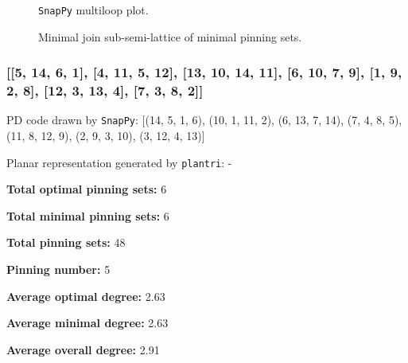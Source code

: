 \documentclass{article}%
\begin{document}
\begin{multicols}{2}
\begin{figure}[H]
\centering

\caption{\texttt{SnapPy} multiloop plot.}
\label{fig:tex/img/[[7, 14, 8, 1], [6, 11, 7, 12], [13, 10, 14, 11], [8, 3, 9, 4], [1, 4, 2, 5], [12, 5, 13, 6], [2, 9, 3, 10]].svg}
\end{figure}
\columnbreak

\begin{figure}[H]
\centering
\scalebox{0.8}{}
\caption{Minimal join sub-semi-lattice of minimal pinning sets.}
\label{fig:tex/img/[[7, 14, 8, 1], [6, 11, 7, 12], [13, 10, 14, 11], [8, 3, 9, 4], [1, 4, 2, 5], [12, 5, 13, 6], [2, 9, 3, 10]].pgf}
\end{figure}
\end{multicols}

\newpage

\subsubsection{[[5, 14, 6, 1], [4, 11, 5, 12], [13, 10, 14, 11], [6, 10, 7, 9], [1, 9, 2, 8], [12, 3, 13, 4], [7, 3, 8, 2]]}

{\small\noindent PD code drawn by \texttt{SnapPy}: [(14, 5, 1, 6), (10, 1, 11, 2), (6, 13, 7, 14), (7, 4, 8, 5), (11, 8, 12, 9), (2, 9, 3, 10), (3, 12, 4, 13)]}

{\small\noindent Planar representation generated by \texttt{plantri}: -}

\begin{multicols}{2}
{\normalsize \noindent\textbf{Total optimal pinning sets:} 6

\noindent\textbf{Total minimal pinning sets:} 6

\noindent\textbf{Total pinning sets:} 48

\noindent\textbf{Pinning number:} 5

}
\columnbreak

{\normalsize \noindent\textbf{Average optimal degree:} 2.63

\noindent\textbf{Average minimal degree:} 2.63

\noindent\textbf{Average overall degree:} 2.91

}
\end{multicols}
\end{document}
